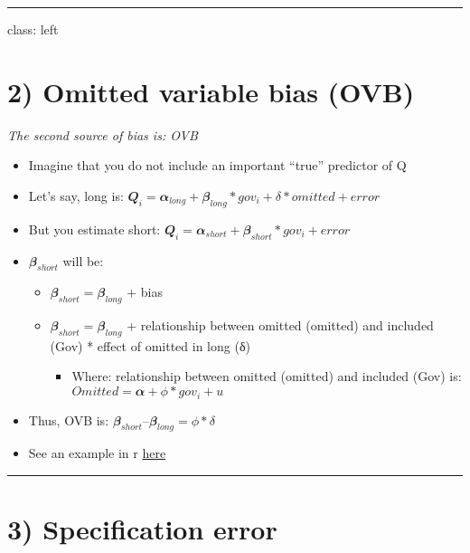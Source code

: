 \documentclass[
]{article}
\providecommand{\tightlist}{%
  \setlength{\itemsep}{0pt}\setlength{\parskip}{0pt}}
\begin{document}
\begin{center}\rule{0.5\linewidth}{0.5pt}\end{center}

class: left

\hypertarget{omitted-variable-bias-ovb}{%
\section{2) Omitted variable bias
(OVB)}\label{omitted-variable-bias-ovb}}

\emph{The second source of bias is: OVB}

\begin{itemize}
\item
  Imagine that you do not include an important ``true'' predictor of Q
\item
  Let's say, long is:
  \(𝑸_{i} = 𝜶_{long} + 𝜷_{long}* gov_{i} + δ * omitted + error\)
\item
  But you estimate short:
  \(𝑸_{i} = 𝜶_{short} + 𝜷_{short}* gov_{i} + error\)
\item
  \(𝜷_{short}\) will be:

  \begin{itemize}
  \item
    \(𝜷_{short} = 𝜷_{long}\) + bias
  \item
    \(𝜷_{short} = 𝜷_{long}\) + relationship between omitted (omitted)
    and included (Gov) * effect of omitted in long (δ)

    \begin{itemize}
    \tightlist
    \item
      Where: relationship between omitted (omitted) and included (Gov)
      is: \(Omitted = 𝜶 + ϕ *gov_{i} + u\)
    \end{itemize}
  \end{itemize}
\item
  Thus, OVB is: \(𝜷_{short} – 𝜷_{long} = ϕ * δ\)
\item
  See an example in r
  \href{https://www.youtube.com/watch?v=-Il68vTUI5I}{here}
\end{itemize}

\begin{center}\rule{0.5\linewidth}{0.5pt}\end{center}

\hypertarget{specification-error}{%
\section{3) Specification error}\label{specification-error}}
\end{document}
